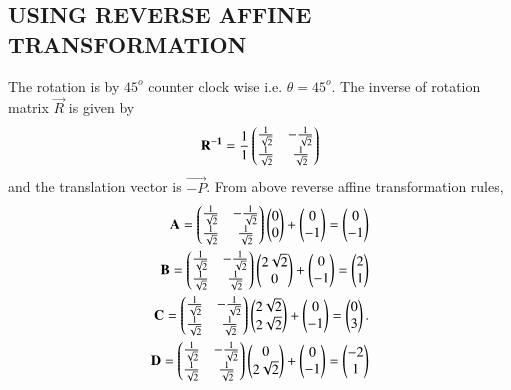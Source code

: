 \documentclass[journal,12pt,twocolumn]{IEEEtran}
\begin{document}
\subsection{USING REVERSE AFFINE TRANSFORMATION}
The rotation is by $45^{o}$ counter clock wise i.e. $\theta = 45^{o}$. The inverse of rotation matrix $\vec{R}$ is given by 
\begin{align}
\begin{split}
\mathbf{R^{-1}} = \frac{1}{1}\begin{pmatrix}\frac{1}{\sqrt{2}}&-\frac{1}{\sqrt{2}}\\\frac{1}{\sqrt{2}}&\frac{1}{\sqrt{2}}\end{pmatrix}\\
\end{split}
\end{align} and the translation vector is $\vec{-P}$.
From above reverse affine transformation rules,
\begin{align}
\begin{split}
\mathbf{A} = \begin{pmatrix}\frac{1}{\sqrt{2}}&-\frac{1}{\sqrt{2}}\\\frac{1}{\sqrt{2}}&\frac{1}{\sqrt{2}}\end{pmatrix}\begin{pmatrix}0 \\ 0\end{pmatrix}  + \begin{pmatrix}0\\-1\end{pmatrix} = \begin{pmatrix}0\\-1\end{pmatrix}\\
\mathbf{B} = \begin{pmatrix}\frac{1}{\sqrt{2}}&-\frac{1}{\sqrt{2}}\\\frac{1}{\sqrt{2}}&\frac{1}{\sqrt{2}}\end{pmatrix}\begin{pmatrix}2\sqrt{2} \\ 0\end{pmatrix}  + \begin{pmatrix}0\\-1\end{pmatrix} = \begin{pmatrix}2\\1\end{pmatrix}\\
\mathbf{C} = \begin{pmatrix}\frac{1}{\sqrt{2}}&-\frac{1}{\sqrt{2}}\\\frac{1}{\sqrt{2}}&\frac{1}{\sqrt{2}}\end{pmatrix}\begin{pmatrix}2\sqrt{2} \\ 2\sqrt{2}\end{pmatrix} + \begin{pmatrix}0\\-1\end{pmatrix} = \begin{pmatrix}0\\3\end{pmatrix}.\\
\mathbf{D} = \begin{pmatrix}\frac{1}{\sqrt{2}}&-\frac{1}{\sqrt{2}}\\\frac{1}{\sqrt{2}}&\frac{1}{\sqrt{2}}\end{pmatrix}\begin{pmatrix}0 \\ 2\sqrt{2}\end{pmatrix}  + \begin{pmatrix}0\\-1\end{pmatrix} = \begin{pmatrix}-2\\1\end{pmatrix}\\
\end{split}
\end{align}
\end{document}
